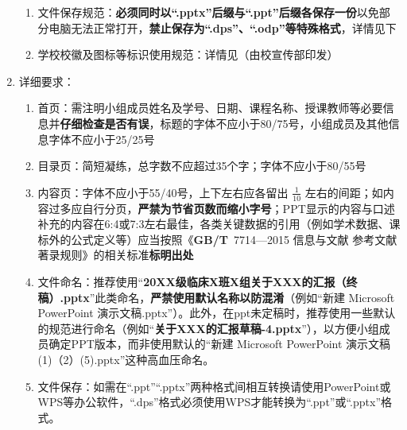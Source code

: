 \begin{enumerate}
\begin{enumerate}
              \item 文件保存规范\footnotemark：\textbf{必须同时以“.pptx”后缀与“.ppt”后缀各保存一份}以免部分电脑无法正常打开，\textbf{禁止保存为“.dps”、“.odp”等特殊格式}，详情见下
              \item 学校校徽及图标等标识使用规范：详情见（由校宣传部印发）
          \end{enumerate}
    \item 详细要求：
          \begin{enumerate}
              \item 首页：需注明小组成员姓名及学号、日期、课程名称、授课教师等必要信息并\textbf{仔细检查是否有误}，标题的字体不应小于80/75号，小组成员及其他信息字体不应小于25/25号
              \item 目录页：简短凝练，总字数不应超过35个字；字体不应小于80/55号
              \item 内容页：字体\footnotemark 不应小于55/40号，上下左右应各留出 $\frac{1}{10}$ 左右的间距；如内容过多应自行分页，\textbf{严禁为节省页数而缩小字号}；PPT显示的内容与口述补充的内容在6:4或7:3左右最佳，各类关键数据的引用（例如学术数据、课标外的公式定义等）应当按照\linebreak[3]《\textbf{GB/T}\ 7714—2015 信息与文献 参考文献著录规则》的相关标准\textbf{标明出处}
              \item 文件命名\footnotemark：推荐使用“\textbf{20XX级临床X班X组关于XXX的汇报（终稿）.pptx}”此类命名，\textbf{严禁使用默认名称以防混淆}（例如“新建 Microsoft PowerPoint 演示文稿.pptx”）。此外，在ppt未定稿时，推荐使用一些默认的规范进行命名（例如“\textbf{关于XXX的汇报草稿-4.pptx}”），以方便小组成员确定PPT版本，而非使用默认的“新建 Microsoft PowerPoint 演示文稿(1)（2）(5).pptx”这种高血压命名。
              \item 文件保存\footnotemark：如需在“.ppt”“.pptx”两种格式间相互转换请使用PowerPoint或WPS等办公软件，“.dps”格式必须使用WPS才能转换为“.ppt”或“.pptx”格式。
          \end{enumerate}
\end{enumerate}

